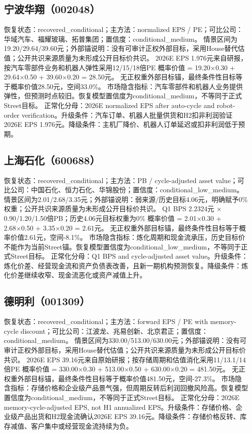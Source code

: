 \subsection{宁波华翔（002048）}
恢复状态：recovered\_conditional；主方法：normalized EPS / PE；可比公司：华域汽车、福耀玻璃、拓普集团；置信度：conditional\_medium。
情景区间为19.20/29.64/39.60元；外部锚说明：没有可审计正权外部目标，采用House替代估值；公开共识来源质量为未形成公开目标价共识。
2026E EPS 1.976元来自研报，按汽车零部件业务和机器人弹性采用12/15/18倍PE
概率价值 = 19.20×0.30 + 29.64×0.50 + 39.60×0.20 = 28.50元。
无正权重外部目标锚，最终条件性目标等于概率价值28.50元，空间33.0\%。
市场隐含指标：汽车零部件和机器人业务提供弹性，但预测时点较旧。恢复模型置信度为conditional\_medium，不等同于正式Street目标。
正常化分母：2026E normalized EPS after auto-cycle and robot-order verification。升级条件：汽车订单、机器人批量供货和H2扣非利润验证2026E EPS 1.976元。降级条件：主机厂降价、机器人订单延迟或扣非利润低于预期。
\subsection{上海石化（600688）}
恢复状态：recovered\_conditional；主方法：PB / cycle-adjusted asset value；可比公司：中国石化、恒力石化、华锦股份；置信度：conditional\_low\_medium。
情景区间为2.01/2.68/3.35元；外部锚说明：弱来源/历史目标4.06元，明确赋予0\%权重；公开共识来源质量为未形成公开目标价共识。
Q1 BPS 2.2324元 × 0.90/1.20/1.50倍PB；历史4.06元目标权重为0\%
概率价值 = 2.01×0.30 + 2.68×0.50 + 3.35×0.20 = 2.61元。
无正权重外部目标锚，最终条件性目标等于概率价值2.61元，空间-8.1\%。
市场隐含指标：炼化周期和现金流承压，历史目标价不能作为当前Street锚。恢复模型置信度为conditional\_low\_medium，不等同于正式Street目标。
正常化分母：Q1 BPS and cycle-adjusted asset value。升级条件：炼化价差、经营现金流和资产负债表改善，且新一期机构预测恢复。降级条件：炼化价差继续收窄、现金流恶化或资产减值上升。
\subsection{德明利（001309）}
恢复状态：recovered\_conditional；主方法：forward EPS / PE with memory-cycle discount；可比公司：江波龙、兆易创新、北京君正；置信度：conditional\_medium。
情景区间为330.00/513.00/630.00元；外部锚说明：没有可审计正权外部目标，采用House替代估值；公开共识来源质量为未形成公开目标价共识。
2026E EPS 39.16元来自原始研报；按存储周期和估值消化采用11/13.1/14倍PE
概率价值 = 330.00×0.30 + 513.00×0.50 + 630.00×0.20 = 481.50元。
无正权重外部目标锚，最终条件性目标等于概率价值481.50元，空间-27.3\%。
市场隐含指标：存储价格和企业级产品景气强，但周期反转后利润回撤风险高。恢复模型置信度为conditional\_medium，不等同于正式Street目标。
正常化分母：2026E memory-cycle-adjusted EPS, not H1 annualized EPS。升级条件：存储价格、企业级产品出货和H2现金流确认2026E EPS 39.16元。降级条件：存储价格反转、库存减值、客户集中或经营现金流持续为负。
